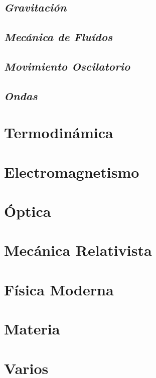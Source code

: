     \section{\textit{Gravitación}}
    \lipsum[1-5]
    \section{\textit{Mecánica de Fluídos}}
    \lipsum[1-5]
    \section{\textit{Movimiento Oscilatorio}}
    \lipsum[1-5]
    \section{\textit{Ondas}}
    \lipsum[1-5]
\chapter{Termodinámica}
\chapter{Electromagnetismo}
\chapter{Óptica}
\chapter{Mecánica Relativista}
\chapter{Física Moderna}
\chapter{Materia}
\chapter{Varios}


